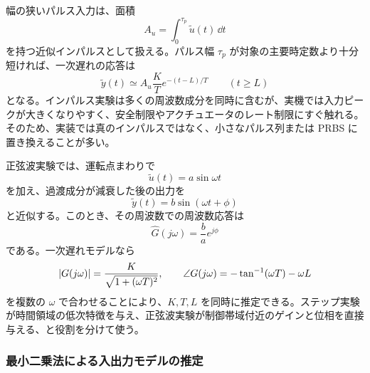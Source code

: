 幅の狭いパルス入力は、面積
\begin{equation}
  A_u=\int_0^{\tau_p}\tilde{u}(t)\,\dd t
\end{equation}
を持つ近似インパルスとして扱える。パルス幅 $\tau_p$ が対象の主要時定数より十分短ければ、一次遅れの応答は
\begin{equation}
  \tilde{y}(t)\simeq A_u\frac{K}{T}e^{-(t-L)/T}
  \qquad (t\ge L)
\end{equation}
となる。インパルス実験は多くの周波数成分を同時に含むが、実機では入力ピークが大きくなりやすく、安全制限やアクチュエータのレート制限にすぐ触れる。そのため、実装では真のインパルスではなく、小さなパルス列または PRBS に置き換えることが多い。

正弦波実験では、運転点まわりで
\begin{equation}
  \tilde{u}(t)=a\sin\omega t
\end{equation}
を加え、過渡成分が減衰した後の出力を
\begin{equation}
  \tilde{y}(t)=b\sin(\omega t+\phi)
\end{equation}
と近似する。このとき、その周波数での周波数応答は
\begin{equation}
  \hat{G}(j\omega)=\frac{b}{a}e^{j\phi}
\end{equation}
である。一次遅れモデルなら
\begin{equation}
  \left|G(j\omega)\right|
  =\frac{K}{\sqrt{1+(\omega T)^2}},
  \qquad
  \angle G(j\omega)=-\tan^{-1}(\omega T)-\omega L
\end{equation}
を複数の $\omega$ で合わせることにより、$K,T,L$ を同時に推定できる。ステップ実験が時間領域の低次特徴を与え、正弦波実験が制御帯域付近のゲインと位相を直接与える、と役割を分けて使う。

\subsubsection{最小二乗法による入出力モデルの推定}

